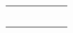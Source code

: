 \begin{longtable}{>{\centering}p{1cm}>{\centering}p{2.2cm}			
	>{}p{5cm}>{\centering}p{2cm}>{\centering}p{2cm}}
	\			
	\end{longtable}

\renewcommand{\arraystretch}{1}
